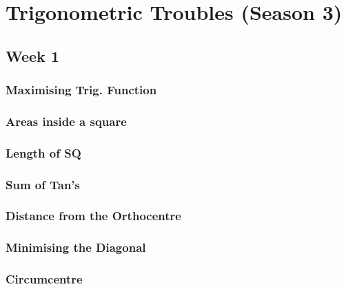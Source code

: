 \documentclass[titlepage=true]{scrartcl}
\begin{document}
\section{Trigonometric Troubles (Season 3)}
    \subsection{Week 1}

        \subsubsection{Maximising Trig. Function}
            \label{3-1-1}
            
        \newpage

        \subsubsection{Areas inside a square}
            \label{3-1-2}
            
        \newpage

        \subsubsection{Length of SQ}
            \label{3-1-3}
            
        \newpage
        
        \subsubsection{Sum of Tan's}
            \label{3-1-4}
            

        \subsubsection{Distance from the Orthocentre}
            \label{3-1-5}
            
        \newpage 

        \subsubsection{Minimising the Diagonal}
            \label{3-1-6}
            
        \newpage

        \subsubsection{Circumcentre}
            \label{3-1-7}
            
        \newpage
\end{document}
